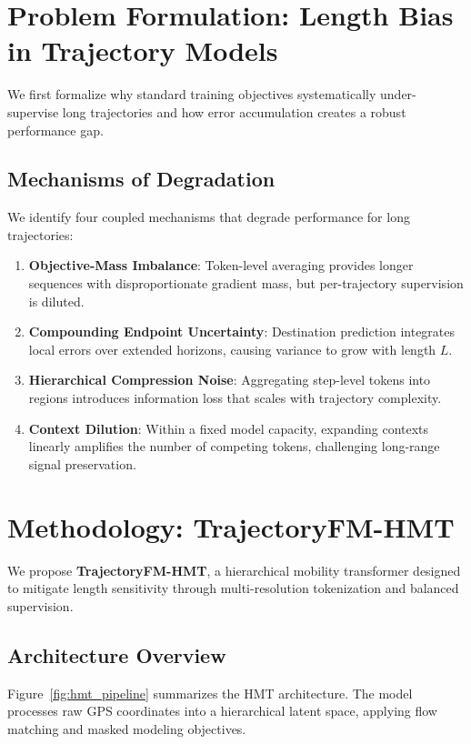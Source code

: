 \documentclass{article}
\begin{document}
\section{Problem Formulation: Length Bias in Trajectory Models}
We first formalize why standard training objectives systematically under-supervise long trajectories and how error accumulation creates a robust performance gap.

\subsection{Mechanisms of Degradation}
We identify four coupled mechanisms that degrade performance for long trajectories:
\begin{enumerate}
    \item \textbf{Objective-Mass Imbalance}: Token-level averaging provides longer sequences with disproportionate gradient mass, but per-trajectory supervision is diluted.
    \item \textbf{Compounding Endpoint Uncertainty}: Destination prediction integrates local errors over extended horizons, causing variance to grow with length $L$.
    \item \textbf{Hierarchical Compression Noise}: Aggregating step-level tokens into regions introduces information loss that scales with trajectory complexity.
    \item \textbf{Context Dilution}: Within a fixed model capacity, expanding contexts linearly amplifies the number of competing tokens, challenging long-range signal preservation.
\end{enumerate}

\section{Methodology: TrajectoryFM-HMT}
We propose \textbf{TrajectoryFM-HMT}, a hierarchical mobility transformer designed to mitigate length sensitivity through multi-resolution tokenization and balanced supervision.

\subsection{Architecture Overview}
Figure~\ref{fig:hmt_pipeline} summarizes the HMT architecture. The model processes raw GPS coordinates into a hierarchical latent space, applying flow matching and masked modeling objectives.
\end{document}
